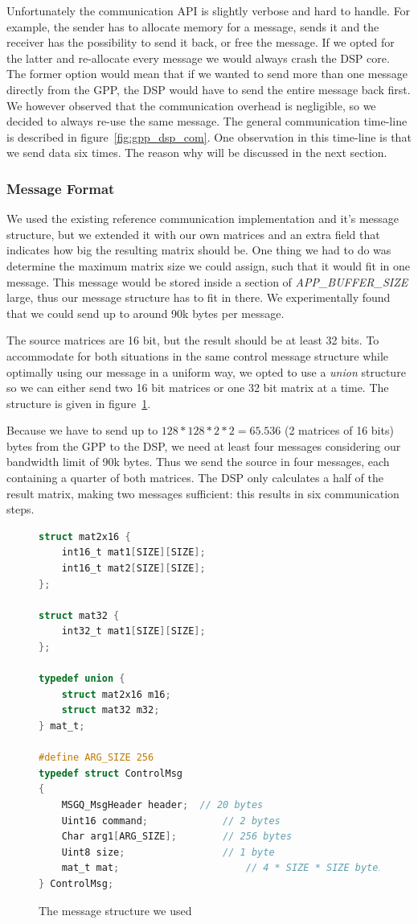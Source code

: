 Unfortunately the communication API is slightly verbose and hard to handle.
For example, the sender has to allocate memory for a message, sends it and the
receiver has the possibility to send it back, or free the message. If we opted
for the latter and re-allocate every message we would always crash the DSP core.
The former option would mean that if we wanted to send more than one message
directly from the GPP, the DSP would have to send the entire message back first.
We however observed that the communication overhead is negligible, so we
decided to always re-use the same message. The general communication time-line
is described in figure~\ref{fig:gpp_dsp_com}. One observation in this time-line
is that we send data six times. The reason why will be discussed in the next
section.

\subsubsection{Message Format}
We used the existing reference communication implementation and it's message
structure, but we extended it with our own matrices and an extra field that
indicates how big the resulting matrix should be. One thing we had to do 
was determine the maximum matrix size we could assign, such that it would fit 
in one message. This message would be stored inside a section of
\emph{APP\_BUFFER\_SIZE} large, thus our message structure has to fit in there. 
We experimentally found that we could send up to around 90k bytes per message.

The source matrices are 16 bit, but the result should be at least 32 bits. 
To accommodate for both 
situations in the same control message structure while optimally using our
message in a uniform way, we opted to use a \emph{union} structure so we 
can either send two 16 bit matrices or one 32 bit matrix at a time. The 
structure is given in figure~\ref{code:control_msg}. 

Because we have to send up to $128*128*2*2=65.536$ (2 matrices of 16 bits)
bytes from the GPP to the DSP, we need at least four messages considering
our bandwidth limit of 90k bytes. Thus we send the source in four messages, 
each containing a quarter of both matrices. The DSP only calculates a half of
the result matrix, making two messages sufficient: this results in six 
communication steps.

\begin{figure}[h]
\begin{lstlisting}[language=C]
struct mat2x16 {
	int16_t mat1[SIZE][SIZE];
	int16_t mat2[SIZE][SIZE];
};

struct mat32 {
	int32_t mat1[SIZE][SIZE];
};

typedef union {
	struct mat2x16 m16;
	struct mat32 m32;
} mat_t;

#define ARG_SIZE 256
typedef struct ControlMsg
{
    MSGQ_MsgHeader header;	// 20 bytes
    Uint16 command;				// 2 bytes
    Char arg1[ARG_SIZE];		// 256 bytes
    Uint8 size;					// 1 byte
    mat_t mat;						// 4 * SIZE * SIZE bytes
} ControlMsg;
\end{lstlisting}
\caption{The message structure we used}
\label{code:control_msg}
\end{figure}
